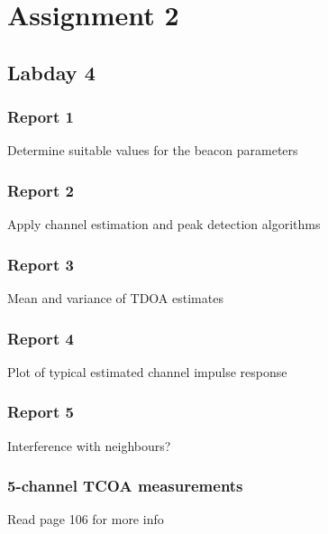 \documentclass[11pt,titlepage]{report}
\begin{document}
\chapter{Assignment 2}
\section{Labday 4}

\subsection{Report 1}
Determine suitable values for the beacon parameters

\subsection{Report 2}
Apply channel estimation and peak detection algorithms

\subsection{Report 3}
Mean and variance of TDOA estimates

\subsection{Report 4}
Plot of typical estimated channel impulse response

\subsection{Report 5}
Interference with neighbours?

\subsection{5-channel TCOA measurements}
Read page 106 for more info
\end{document}
